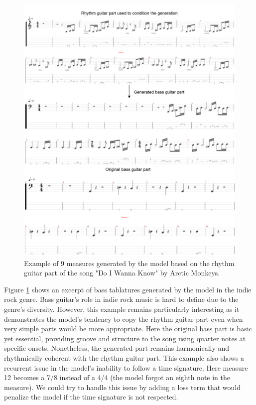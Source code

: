 
\begin{figure}[!ht]
    \centering
    \includegraphics[width=0.85\linewidth]{../images-figures/gen_arctic_monkeys.png}
    \caption{Example of 9 measures generated by the model based on the rhythm guitar part of the song "Do I Wanna Know" by Arctic Monkeys.}
    \label{fig:gen_arctic_monkeys}
\end{figure}

Figure \ref{fig:gen_arctic_monkeys} shows an excerpt of bass tablatures generated by the model in the indie rock genre.
Bass guitar's role in indie rock music is hard to define due to the genre's diversity.
However, this example remains particularly interesting as it demonstrates the model's tendency to copy the rhythm guitar part even when very simple parts would be more appropriate.
Here the original bass part is basic yet essential, providing groove and structure to the song using quarter notes at specific onsets.
Nonetheless, the generated part remains harmonically and rhythmically coherent with the rhythm guitar part.
This example also shows a recurrent issue in the model's inability to follow a time signature.
Here measure 12 becomes a 7/8 instead of a 4/4 (the model forgot an eighth note in the measure).
We could try to handle this issue by adding a loss term that would penalize the model if the time signature is not respected.

